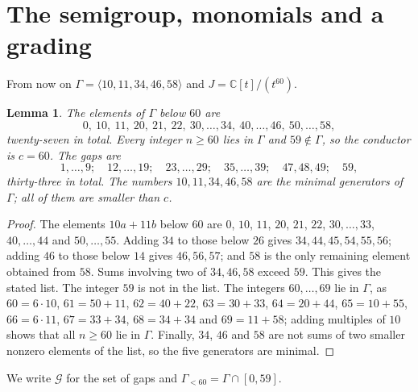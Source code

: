 \documentclass{amsart}
\newtheorem{lemma}[theorem]{Lemma}
\theoremstyle{definition}
\theoremstyle{remark}
\numberwithin{equation}{section}
\newcommand{\CC}{\mathbb{C}}
\begin{document}
\section{The semigroup, monomials and a grading}\label{sec:semigroup}

From now on $\Gamma=\langle10,11,34,46,58\rangle$ and $J=\CC[t]/(t^{60})$.

\begin{lemma}\label{lem:semigroup}
The elements of $\Gamma$ below $60$ are
\[
0,\ 10,\ 11,\ 20,\ 21,\ 22,\ 30,\dots,34,\ 40,\dots,46,\ 50,\dots,58,
\]
twenty-seven in total. Every integer $n\ge60$ lies in $\Gamma$ and $59\notin\Gamma$, so the conductor is $c=60$. The gaps are
\[
1,\dots,9;\quad 12,\dots,19;\quad 23,\dots,29;\quad 35,\dots,39;\quad 47,48,49;\quad 59,
\]
thirty-three in total. The numbers $10,11,34,46,58$ are the minimal generators of $\Gamma$; all of them are smaller than $c$.
\end{lemma}

\begin{proof}
The elements $10a+11b$ below $60$ are $0$, $10$, $11$, $20$, $21$, $22$, $30,\dots,33$, $40,\dots,44$ and $50,\dots,55$. Adding $34$ to those below $26$ gives $34,44,45,54,55,56$; adding $46$ to those below $14$ gives $46,56,57$; and $58$ is the only remaining element obtained from $58$. Sums involving two of $34,46,58$ exceed $59$. This gives the stated list. The integer $59$ is not in the list. The integers $60,\dots,69$ lie in $\Gamma$, as $60=6\cdot10$, $61=50+11$, $62=40+22$, $63=30+33$, $64=20+44$, $65=10+55$, $66=6\cdot11$, $67=33+34$, $68=34+34$ and $69=11+58$; adding multiples of $10$ shows that all $n\ge60$ lie in $\Gamma$. Finally, $34$, $46$ and $58$ are not sums of two smaller nonzero elements of the list, so the five generators are minimal.
\end{proof}

We write $\mathcal{G}$ for the set of gaps and $\Gamma_{<60}=\Gamma\cap[0,59]$.
\end{document}
